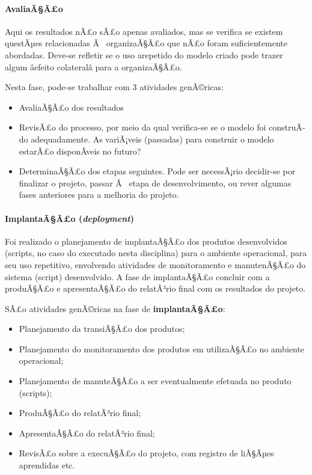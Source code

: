 \documentclass[]{article}
\providecommand{\tightlist}{%
  \setlength{\itemsep}{0pt}\setlength{\parskip}{0pt}}
\let\oldparagraph\paragraph
\renewcommand{\paragraph}[1]{\oldparagraph{#1}\mbox{}}
\begin{document}
\paragraph{\texorpdfstring{\textbf{AvaliaÃ§Ã£o}}{AvaliaÃ§Ã£o}}\label{avaliaaao}

Aqui os resultados nÃ£o sÃ£o apenas avaliados, mas se verifica se
existem questÃµes relacionadas Ã~ organizaÃ§Ã£o que nÃ£o foram
suficientemente abordadas. Deve-se refletir se o uso arepetido do modelo
criado pode trazer algum âefeito colateralâ para a organizaÃ§Ã£o.

Nesta fase, pode-se trabalhar com 3 atividades genÃ©ricas:

\begin{itemize}
\item
  AvaliaÃ§Ã£o dos resultados
\item
  RevisÃ£o do processo, por meio da qual verifica-se se o modelo foi
  construÃ­do adequadamente. As variÃ¡veis (passadas) para construir o
  modelo estarÃ£o disponÃ­veis no futuro?
\item
  DeterminaÃ§Ã£o dos etapas seguintes. Pode ser necessÃ¡rio decidir-se
  por finalizar o projeto, passar Ã~ etapa de desenvolvimento, ou rever
  algumas fases anteriores para a melhoria do projeto.
\end{itemize}

\paragraph{\texorpdfstring{\textbf{ImplantaÃ§Ã£o}
(\emph{deployment})}{ImplantaÃ§Ã£o (deployment)}}\label{implantaaao-deployment}

Foi realizado o planejamento de implantaÃ§Ã£o dos produtos desenvolvidos
(scripts, no caso do executado nesta disciplina) para o ambiente
operacional, para seu uso repetitivo, envolvendo atividades de
monitoramento e manutenÃ§Ã£o do sistema (script) desenvolvido. A fase de
implantaÃ§Ã£o concluir com a produÃ§Ã£o e apresentaÃ§Ã£o do relatÃ³rio
final com os resultados do projeto.

SÃ£o atividades genÃ©ricas na fase de \textbf{implantaÃ§Ã£o}:

\begin{itemize}
\tightlist
\item
  Planejamento da transiÃ§Ã£o dos produtos;
\item
  Planejamento do monitoramento dos produtos em utilizaÃ§Ã£o no ambiente
  operacional;
\item
  Planejamento de manuteÃ§Ã£o a ser eventualmente efetuada no produto
  (scripts);
\item
  ProduÃ§Ã£o do relatÃ³rio final;
\item
  ApresentaÃ§Ã£o do relatÃ³rio final;
\item
  RevisÃ£o sobre a execuÃ§Ã£o do projeto, com registro de liÃ§Ãµes
  aprendidas etc.
\end{itemize}
\end{document}

